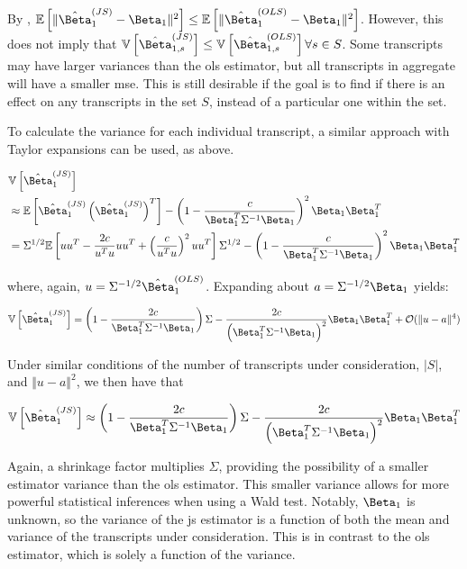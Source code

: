 By \cite[REF][]{bockMinimaxEstimatorsMean1975}, $\mathbb{E} \left[ \Vert \hat{\Beta}_1^{(JS)} - \Beta_1 \Vert ^2\right] \le \mathbb{E} \left[ \Vert \hat{\Beta}_1^{(OLS)} - \Beta_1 \Vert ^2\right]$.
However, this does not imply that $\mathbb{V} \left[ \hat{\Beta}_{1,s}^{(JS)} \right] \le \mathbb{V} \left[ \hat{\Beta}_{1,s}^{(OLS)} \right] \forall s \in S$.
Some transcripts may have larger variances than the \gls{ols} estimator, but all transcripts in aggregate will have a smaller \gls{mse}.
This is still desirable if the goal is to find if there is an effect on any transcripts in the set $S$, instead of a particular one within the set.

To calculate the variance for each individual transcript, a similar approach with Taylor expansions can be used, as above.

\begin{align*}
  &\mathbb{V} \left[ \hat{\Beta}_1^{(JS)} \right] \\
  &\approx \mathbb{E} \left[ \hat{\Beta}_1^{(JS)}
    \left( \hat{\Beta}_1^{(JS)} \right)^T \right]
    - \left(1 - \frac{c}{\Beta_1^T \Sigma^{-1} \Beta_1} \right)^2 \Beta_1 \Beta_1^T \\
  &= \Sigma^{1/2} \mathbb{E} \left[ u u^T - \frac{2c}{u^Tu}uu^T + \left( \frac{c}{u^Tu} \right)^2 uu^T \right]\Sigma^{1/2}
    - \left(1 - \frac{c}{\Beta_1^T \Sigma^{-1} \Beta_1} \right)^2 \Beta_1 \Beta_1^T \\
\end{align*}

where, again, $u = \Sigma^{-1/2} \hat{\Beta}_1^{(OLS)}$.
Expanding about $a = \Sigma^{-1/2} \Beta_1$ yields:

\begin{equation*}
  \mathbb{V} \left [ \hat{\Beta}_1^{(JS)} \right]
  = \left(1 - \frac{2c}{\Beta_1^T \Sigma^{-1} \Beta_1} \right) \Sigma
    - \frac{2c}{\left( \Beta_1^T \Sigma^{-1} \Beta_1 \right)^2} \Beta_1 \Beta_1^T
    + \mathcal{O}(\Vert u - a \Vert ^4)
\end{equation*}

Under similar conditions of the number of transcripts under consideration, $|S|$, and $\Vert u - a \Vert ^2$, we then have that

\begin{equation}
  \mathbb{V} \left [ \hat{\Beta}_1^{(JS)} \right]
  \approx \left(1 - \frac{2c}{\Beta_1^T \Sigma^{-1} \Beta_1} \right) \Sigma
  - \frac{2c}{\left( \Beta_1^T \Sigma^{-1} \Beta_1 \right)^2} \Beta_1 \Beta_1^T
\end{equation}

Again, a shrinkage factor multiplies $\Sigma$, providing the possibility of a smaller estimator variance than the \gls{ols} estimator.
This smaller variance allows for more powerful statistical inferences when using a Wald test.
Notably, $\Beta_1$ is unknown, so the variance of the \gls{js} estimator is a function of both the mean and variance of the transcripts under consideration.
This is in contrast to the \gls{ols} estimator, which is solely a function of the variance.
